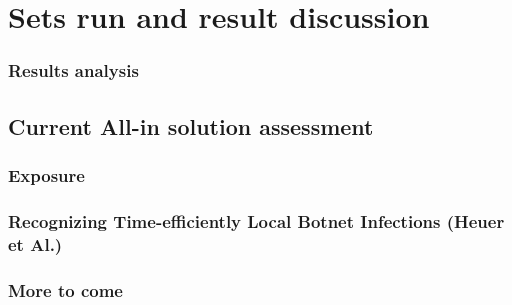 
\chapter{Sets run and result discussion} %

\label{Sets run and result discussion} %

\subsection{Results analysis}
\section{Current All-in solution assessment}
\subsection{Exposure}
\subsection{Recognizing Time-efficiently Local Botnet Infections (Heuer et Al.)}
\subsection{More to come}

